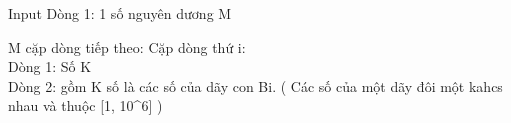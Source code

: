 Input
Dòng 1: 1 số nguyên dương M

M cặp dòng tiếp theo: Cặp dòng thứ i:
\\Dòng 1: Số K
\\Dòng 2: gồm K số là các số của dãy con Bi. ( Các số của một dãy đôi một kahcs nhau và thuộc [1, 10^6] )